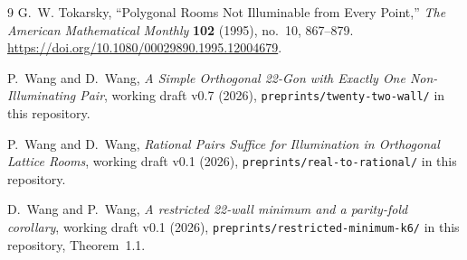 \documentclass[11pt]{article}
\theoremstyle{definition}
\theoremstyle{remark}
\begin{document}
\begin{thebibliography}{9}
G.~W. Tokarsky, ``Polygonal Rooms Not Illuminable from Every Point,''
\emph{The American Mathematical Monthly} \textbf{102} (1995), no.~10, 867--879.
\url{https://doi.org/10.1080/00029890.1995.12004679}.

P.~Wang and D.~Wang, \emph{A Simple Orthogonal 22-Gon with Exactly One
Non-Illuminating Pair}, working draft v0.7 (2026), \texttt{preprints/twenty-two-wall/} in this repository.

P.~Wang and D.~Wang, \emph{Rational Pairs Suffice for Illumination in
Orthogonal Lattice Rooms}, working draft v0.1 (2026),
\texttt{preprints/real-to-rational/} in this repository.

D.~Wang and P.~Wang, \emph{A restricted 22-wall minimum and a parity-fold
corollary}, working draft v0.1 (2026), \texttt{preprints/restricted-minimum-k6/} in this repository,
Theorem~1.1.
\end{thebibliography}
\end{document}
